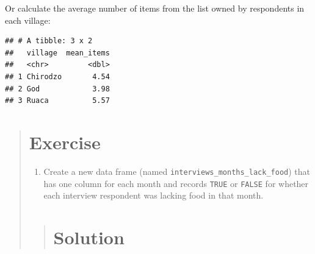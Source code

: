 \documentclass[]{book}
\newenvironment{Shaded}{\begin{snugshade}}{\end{snugshade}}
\newcommand{\KeywordTok}[1]{\textcolor[rgb]{0.13,0.29,0.53}{\textbf{#1}}}
\newcommand{\DataTypeTok}[1]{\textcolor[rgb]{0.13,0.29,0.53}{#1}}
\newcommand{\StringTok}[1]{\textcolor[rgb]{0.31,0.60,0.02}{#1}}
\newcommand{\OtherTok}[1]{\textcolor[rgb]{0.56,0.35,0.01}{#1}}
\newcommand{\OperatorTok}[1]{\textcolor[rgb]{0.81,0.36,0.00}{\textbf{#1}}}
\newcommand{\NormalTok}[1]{#1}
\providecommand{\tightlist}{%
  \setlength{\itemsep}{0pt}\setlength{\parskip}{0pt}}
\begin{document}
Or calculate the average number of items from the list owned by
respondents in each village:

\begin{Shaded}
\end{Shaded}

\begin{verbatim}
## # A tibble: 3 x 2
##   village  mean_items
##   <chr>         <dbl>
## 1 Chirodzo       4.54
## 2 God            3.98
## 3 Ruaca          5.57
\end{verbatim}

\begin{quote}
\section{Exercise}\label{exercise-8}

\begin{enumerate}
\def\labelenumi{\arabic{enumi}.}
\tightlist
\item
  Create a new data frame (named
  \texttt{interviews\_months\_lack\_food}) that has one column for each
  month and records \texttt{TRUE} or \texttt{FALSE} for whether each
  interview respondent was lacking food in that month.
\end{enumerate}

\begin{quote}
\section{Solution}\label{solution-9}

\begin{Shaded}
\end{Shaded}
\end{quote}
\end{quote}
\end{document}
